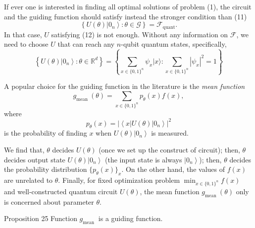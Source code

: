 \begin{remark}
If ever one is interested in finding all optimal solutions of problem (1), the circuit and the guiding function should satisfy instead the stronger condition than (11)
\begin{equation*}
\left\{U(\theta)\left|0_{n}\right\rangle: \theta \in \mathcal{G}\right\}=\mathcal{F}_{\text {quant}}. \tag{13}
\end{equation*}
In that case, $U$ satisfying (12) is not enough. Without any information on $\mathcal{F}$, we need to choose $U$ that can reach any $n$-qubit quantum states, specifically, %
$$
\left\{U(\theta)\left|0_{n}\right\rangle: \theta \in \mathbb{R}^{d}\right\}=\left\{\sum_{x \in\{0,1\}^{n}} \psi_{x}|x\rangle: \sum_{x \in\{0,1\}^{n}}\left|\psi_{x}\right|^{2}=1\right\}
$$
\end{remark}

\begin{definition}
A popular choice for the guiding function in the literature is the \textit{mean function}
\begin{equation*}
g_{\text {mean }}(\theta)=\sum_{x \in\{0,1\}^{n}} p_{\theta}(x) f(x), \tag{14}
\end{equation*}
where 
$$
p_{\theta}(x)=\left|\left\langle x|U(\theta)| 0_{n}\right\rangle\right|^{2}
$$
is the probability of finding $x$ when $U(\theta)\left|0_{n}\right\rangle$ is measured.  %
\end{definition}

We find that, $\theta$ decides $U(\theta)$ (once we set up the construct of circuit); then, $\theta$ decides output state $U(\theta)\left|0_{n}\right\rangle$ (the input state is always $\left|0_{n}\right\rangle$); then, $\theta$ decides the probability distribution $\{p_{\theta}(x)\}_{x}$. On the other hand, the values of $f(x)$ are unrelated to $\theta.$ Finally, for fixed optimization problem $\min _{x \in\{0,1\}^{n}} f(x)$ and well-constructed quantum circuit $U(\theta)$, the mean function $g_{\text {mean }}(\theta)$ only is concerned about parameter $\theta.$ 

\begin{proposition}
    Proposition 25 Function $g_{\text {mean }}$ is a guiding function.
\end{proposition}

